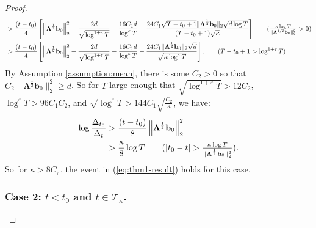 \begin{proof}
\begin{align*}
    &> \frac{(t-t_0)}{4}\left[\left\lVert\boldsymbol{\Lambda}^{\frac{1}{2}}\mathbf{b}_0\right\rVert_2^2 - \frac{2d}{\sqrt{\log^{1+\varepsilon}  T}} - \frac{16C_1 d}{\log^{\varepsilon}T}  - \frac{24C_1\sqrt{T-t_0+1}\lVert\boldsymbol{\Lambda}^{\frac{1}{2}}\mathbf{b}_0\rVert_2\sqrt{d\log T}}{(T-t_0+1)\sqrt{\kappa}}\right] \tag{$\frac{\kappa\log T}{\lVert\boldsymbol{\Lambda}^{1/2}\mathbf{b}_0\rVert_2^2} > 0$} \\
    &> \frac{(t-t_0)}{4}\left[\left\lVert\boldsymbol{\Lambda}^{\frac{1}{2}}\mathbf{b}_0\right\rVert_2^2 - \frac{2d}{\sqrt{\log^{1+\varepsilon}  T}} - \frac{16C_1 d}{\log^{\varepsilon}T}  - \frac{24C_1\lVert\boldsymbol{\Lambda}^{\frac{1}{2}}\mathbf{b}_0\rVert_2\sqrt{d}}{\sqrt{\kappa\log^{\varepsilon}T}}\right]. \tag{$T-t_0+1 > \log^{1+\varepsilon} T$} 
\end{align*}
\normalsize
By Assumption \ref{assumption:mean}, there is some $C_2 > 0$ so that $C_2 \lVert\boldsymbol{\Lambda}^{\frac{1}{2}}\mathbf{b}_0\rVert_2^2 \geq d$. So for $T$ large enough that $\sqrt{\log^{1+\varepsilon}  T} > 12 C_2 $, $\log^{\varepsilon} T > 96 C_1 C_2 $, and $\sqrt{\log^{\varepsilon} T} > 144C_1\sqrt{\frac{C_2 }{\kappa}}$, we have:
\begin{align*}
    \log \frac{\Delta_{t_0}}{\Delta_t} &> \frac{(t-t_0)}{8}\left\lVert\boldsymbol{\Lambda}^{\frac{1}{2}}\mathbf{b}_0\right\rVert_2^2 \\
    &> \frac{\kappa}{8} \log T\tag{$|t_0-t| > \frac{\kappa\log T}{\lVert\boldsymbol{\Lambda}^{\frac{1}{2}}\mathbf{b}_0\rVert_2^2}$}.
\end{align*}
So for $\kappa > 8 C_\pi$, the event in (\ref{eq:thm1-result}) holds for this case.

\subsubsection*{Case 2: $t < t_0$ and $t\in\mathcal{T}_\kappa$.}


\end{proof}
